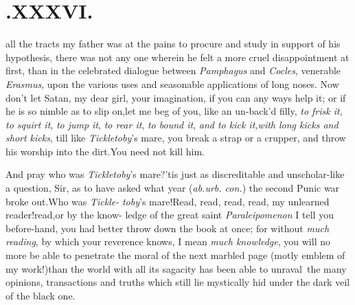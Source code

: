 \documentclass{article}
\begin{document}
\section{.\quad  XXXVI.}

 all the tracts my father was at
the pains to procure and study in support of his hypothesis, there
was not any one wherein he felt a more cruel disappointment at
first, than in the celebrated dialogue between \textit{Pamphagus} and
\textit{Cocles}, 
venerable \textit{Erasmus}, upon the various uses
and seasonable applications of long noses.\break
\tsh Now don’t let Satan, my dear girl, 
your imagination, if you can any ways help it; or if he is so
nimble as to slip on,\tsh let me beg of you, like an un-\break back’d
filly, \textit{to frisk it}, 
\textit{to squirt it}, 
\textit{to jump it}, 
\textit{to rear it}, 
\textit{to bound it},\tsh 
\textit{and to kick it,\break with long kicks and short
kicks}, till like \textit{Tickletoby}’s mare, you break a
strap\break
or a crupper, and throw his worship\break
into the dirt.\tsh You need not kill\break
him.\tsh

\tsk And pray who was \textit{Tickletoby}’s
mare?\tsk ’tis just as discreditable and un\-scholar-like a
question, Sir, as to have asked what year (\textit{ab.\@ urb.\@
con.})\@
the second Punic war broke out.\tsk Who was
\textit{Tickle-}
\textit{toby}’s mare!\tsk Read, read, read, read, my\break
unlearned reader!\@ read,\tsk or by the know-\break 
ledge of the great saint \textit{Paraleipomenon}\tsk\break
I tell you before-hand, you had better
throw down the book at once; for without
\textit{much reading}, by which
your reverence knows, I mean \textit{much knowledge}, you\break
will no more be able to penetrate the moral of the next marbled page 
(motly emblem
of my work!)\@ than the world with all its sagacity has been able to
un\-raval\sic\  the many opinions, transactions and truths which still lie
mystically hid under the dark veil of the black
one.
\end{document}
